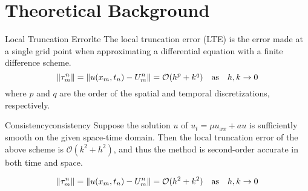 \chapter{Theoretical Background}

\begin{definition}{Local Truncation Error}{lte}
  The local truncation error (LTE) is the error made at a single grid point when approximating a differential equation with a finite difference scheme.
  \[
    \lVert\tau_m^n\rVert = \lVert u(x_m, t_n) - U_m^n\rVert = \mathcal{O}(h^p + k^q) \quad \text{as} \quad h, k \to 0 
  \]
  where \(p\) and \(q\) are the order of the spatial and temporal discretizations, respectively.
\end{definition}

\begin{lemma}{Consistency}{consistency}
  Suppose the solution \(u\) of \(u_t = \mu u_{xx} + a u\) is sufficiently smooth on the given space-time domain.
  Then the local truncation error of the above scheme is \(\mathcal{O}(k^2 + h^2)\), and thus the method is second-order accurate in both time and space.
  
  \[
    \lVert\tau_m^n\rVert = \lVert u(x_m, t_n) - U_m^n\rVert = \mathcal{O}(h^2 + k^2) \quad \text{as} \quad h, k \to 0
  \]

\end{lemma}




